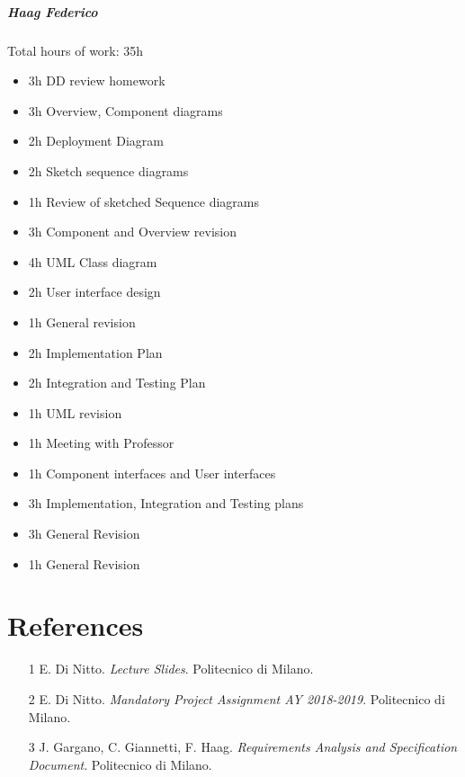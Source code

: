\documentclass{report}
\newcommand{\ic}[1]{\textit{#1}}
\begin{document}
		\paragraph{Haag Federico} Total hours of work: 35h
			\begin{itemize}
				\item 3h DD review homework
				\item 3h Overview, Component diagrams
				\item 2h Deployment Diagram
				\item 2h Sketch sequence diagrams
				\item 1h Review of sketched Sequence diagrams
				\item 3h Component and Overview revision
				\item 4h UML Class diagram
				\item 2h User interface design
				\item 1h General revision
				\item 2h Implementation Plan
				\item 2h Integration and Testing Plan
				\item 1h UML revision
				\item 1h Meeting with Professor
				\item 1h Component interfaces and User interfaces
				\item 3h Implementation, Integration and Testing plans
				\item 3h General Revision
				\item 1h General Revision
			\end{itemize}
			
	\chapter{References}
	\thispagestyle{fancy}
	\begin{itemize}
		\item [1]\label{ref:1} E. Di Nitto. \ic{Lecture Slides}. Politecnico di Milano.
		\item [2]\label{ref:2} E. Di Nitto. \ic{Mandatory Project Assignment AY 2018-2019}. Politecnico di Milano.
		\item [3]\label{ref:3} J. Gargano, C. Giannetti, F. Haag. \ic{Requirements Analysis and Specification Document}. Politecnico di Milano.
	\end{itemize}
	
\end{document}
